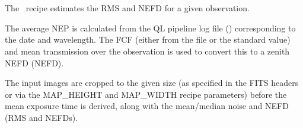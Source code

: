 \chapter{}
\label{app:mapstats}

The \picard\ recipe  estimates the RMS
and NEFD for a given observation.

The average NEP is calculated from the QL pipeline log file
() corresponding to the date and wavelength. The FCF
(either from the file or the standard value) and mean transmission
over the observation is used to convert this to a zenith NEFD
(NEFD).

The input images are cropped to the given size (as specified in the
FITS headers or via the MAP\_HEIGHT and MAP\_WIDTH recipe parameters)
before the mean exposure time is derived, along with the mean/median
noise and NEFD (RMS and NEFDs).

